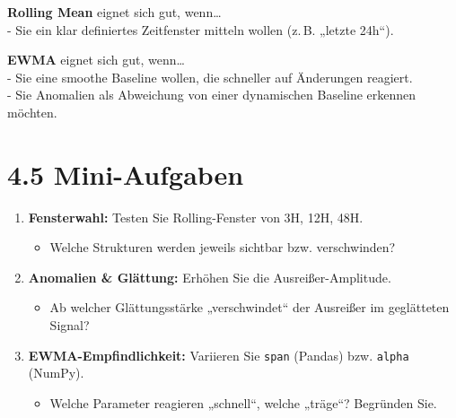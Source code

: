 \documentclass[
  ngerman,
  letterpaper,
  DIV=11]{scrreprt}
\providecommand{\tightlist}{%
  \setlength{\itemsep}{0pt}\setlength{\parskip}{0pt}}
\begin{document}
\begin{tcolorbox}[enhanced jigsaw, titlerule=0mm, title=\textcolor{quarto-callout-tip-color}{\faLightbulb}\hspace{0.5em}{Entscheidungshilfe}, bottomrule=.15mm, opacityback=0, colbacktitle=quarto-callout-tip-color!10!white, coltitle=black, opacitybacktitle=0.6, colframe=quarto-callout-tip-color-frame, toprule=.15mm, leftrule=.75mm, arc=.35mm, rightrule=.15mm, breakable, bottomtitle=1mm, colback=white, toptitle=1mm, left=2mm]

\textbf{Rolling Mean} eignet sich gut, wenn\ldots{}\\
- Sie ein klar definiertes Zeitfenster mitteln wollen (z.\,B. „letzte
24h``).

\textbf{EWMA} eignet sich gut, wenn\ldots{}\\
- Sie eine smoothe Baseline wollen, die schneller auf Änderungen
reagiert.\\
- Sie Anomalien als Abweichung von einer dynamischen Baseline erkennen
möchten.

\end{tcolorbox}

\section{4.5 Mini-Aufgaben}\label{mini-aufgaben}

\begin{enumerate}
\def\labelenumi{\arabic{enumi}.}
\tightlist
\item
  \textbf{Fensterwahl:} Testen Sie Rolling-Fenster von 3H, 12H, 48H.

  \begin{itemize}
  \tightlist
  \item
    Welche Strukturen werden jeweils sichtbar bzw. verschwinden?
  \end{itemize}
\item
  \textbf{Anomalien \& Glättung:} Erhöhen Sie die Ausreißer-Amplitude.

  \begin{itemize}
  \tightlist
  \item
    Ab welcher Glättungsstärke „verschwindet`` der Ausreißer im
    geglätteten Signal?
  \end{itemize}
\item
  \textbf{EWMA-Empfindlichkeit:} Variieren Sie \texttt{span} (Pandas)
  bzw. \texttt{alpha} (NumPy).

  \begin{itemize}
  \tightlist
  \item
    Welche Parameter reagieren „schnell``, welche „träge``? Begründen
    Sie.
  \end{itemize}
\end{enumerate}
\end{document}
